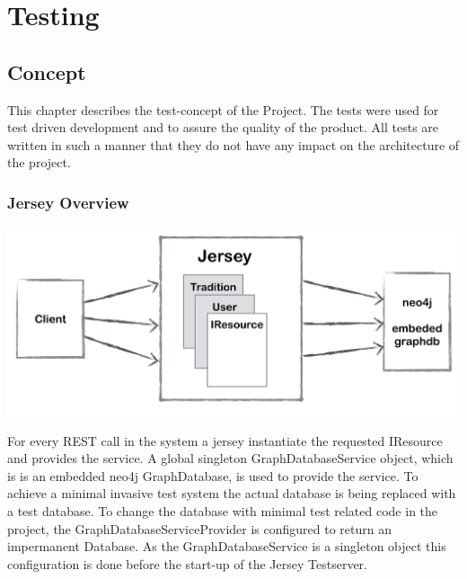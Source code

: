 \documentclass[11pt,fleqn,openany]{book} %
\begin{document}
\part{Testing}



\chapter{Concept}
This chapter describes the test-concept of the Project. The tests were used for test driven development and to assure the quality of the product. All tests are written in such a manner that they do not have any impact on the architecture of the project.

\section*{Jersey Overview} 

\begin{center}
\includegraphics[scale=.40]{Pictures/jerseyoverview.png} 
\end{center}

For every REST call in the system a jersey instantiate the requested IResource and provides the service. A global singleton GraphDatabaseService object, which is is an embedded neo4j GraphDatabase, is used to provide the service. To achieve a minimal invasive test system the actual database is being replaced with a test database. To change the database with minimal test related code in the project, the GraphDatabaseServiceProvider is configured to return an impermanent Database. As the GraphDatabaseService is a singleton object this configuration is done before the start-up of the Jersey Testserver.
\end{document}
